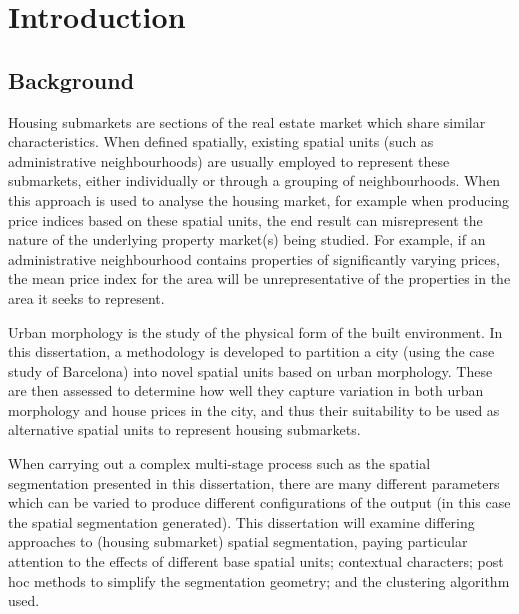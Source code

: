 \documentclass[a4paper, nobind]{templates/ociamthesis}
\begin{document}
\flushbottom

\hypertarget{introduction}{%
\chapter{Introduction}\label{introduction}}

\minitoc 

\hypertarget{background}{%
\section{Background}\label{background}}

Housing submarkets are sections of the real estate market which share similar characteristics. When defined spatially, existing spatial units (such as administrative neighbourhoods) are usually employed to represent these submarkets, either individually or through a grouping of neighbourhoods. When this approach is used to analyse the housing market, for example when producing price indices based on these spatial units, the end result can misrepresent the nature of the underlying property market(s) being studied. For example, if an administrative neighbourhood contains properties of significantly varying prices, the mean price index for the area will be unrepresentative of the properties in the area it seeks to represent.

Urban morphology is the study of the physical form of the built environment. In this dissertation, a methodology is developed to partition a city (using the case study of Barcelona) into novel spatial units based on urban morphology. These are then assessed to determine how well they capture variation in both urban morphology and house prices in the city, and thus their suitability to be used as alternative spatial units to represent housing submarkets.

When carrying out a complex multi-stage process such as the spatial segmentation presented in this dissertation, there are many different parameters which can be varied to produce different configurations of the output (in this case the spatial segmentation generated). This dissertation will examine differing approaches to (housing submarket) spatial segmentation, paying particular attention to the effects of different base spatial units; contextual characters; post hoc methods to simplify the segmentation geometry; and the clustering algorithm used.
\end{document}
